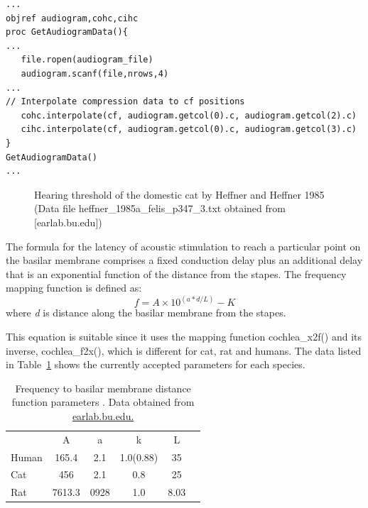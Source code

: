 \begin{lstlisting}[label=lst:getaudiogramdata,caption= Procedure to get
  audiogram data and interpolate to freuencies in \textsf{cf} vector (
  \mbox{\textsf{Utilities.hoc}})]
...
objref audiogram,cohc,cihc
proc GetAudiogramData(){
...
   file.ropen(audiogram_file)
   audiogram.scanf(file,nrows,4)
...
// Interpolate compression data to cf positions 
   cohc.interpolate(cf, audiogram.getcol(0).c, audiogram.getcol(2).c)
   cihc.interpolate(cf, audiogram.getcol(0).c, audiogram.getcol(3).c)
}
GetAudiogramData() 
...
\end{lstlisting}

\medskip{}

\begin{figure}[htb]
\begin{center}
\caption{Hearing threshold of the domestic cat by Heffner and Heffner
  1985 \citep{HeffnerHeffner:1985} (Data file
  \mbox{\textsf{heffner\_1985a\_felis\_p347\_3.txt}} obtained from [earlab.bu.edu])}
\label{fig:AudThresholdRat}
\end{center}
\end{figure}


The formula for the latency of acoustic stimulation to reach a particular point
on the basilar membrane comprises a fixed conduction delay plus an additional
delay that is an exponential function of the distance from the stapes. The
frequency mapping function is defined as:
\begin{equation}
  \label{eq:delay}
 f = A\times10^{\left(a*d/L\right)} - K  
\end{equation}
where \emph{d} is distance along the basilar membrane from the stapes.

\medskip{}

This equation is suitable since it uses the mapping function
\mbox{\textsf{cochlea\_x2f()}} and its inverse, \mbox{\textsf{cochlea\_f2x()}},
which is different for cat, rat and humans.  The data listed in
Table~\ref{tab:f2x} shows the currently accepted parameters for each species.


\begin{table}[h]
  \centering
  \begin{tabular}{lccccc}
\hline
      &   A   &   a  &     k     & L \\
Human & 165.4 &  2.1 & 1.0(0.88) & 35\\
 Cat  &  456  &  2.1 &    0.8    & 25 \\
 Rat  & 7613.3& 0928 &    1.0    & 8.03 \\
\hline
\end{tabular}
  \caption{Frequency to basilar membrane distance function parameters \citep{FitzGeraldBurkittEtAl:2001}. Data obtained from \url{earlab.bu.edu.}}\label{tab:f2x}
\end{table}


